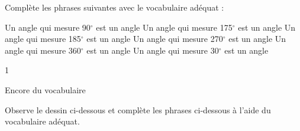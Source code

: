 \documentclass[a4paper,11pt]{report}
\begin{document}
\begin{exop}{
Complète les phrases suivantes avec le vocabulaire adéquat :
\begin{tasks}
\task Un angle qui mesure 90$^{\circ}$ est un angle \hrulefill
\task Un angle qui mesure 175$^{\circ}$ est un angle \hrulefill
\task Un angle qui mesure 185$^{\circ}$ est un angle \hrulefill
\task Un angle qui mesure 270$^{\circ}$ est un angle \hrulefill
\task Un angle qui mesure 360$^{\circ}$ est un angle \hrulefill
\task Un angle qui mesure 30$^{\circ}$ est un angle \hrulefill
\end{tasks}}{1}
\end{exop}

\begin{resolu}
{Encore du vocabulaire}{Observe le dessin ci-dessous et complète les phrases ci-dessous à l'aide du vocabulaire adéquat.

}
\end{resolu}
\end{document}
